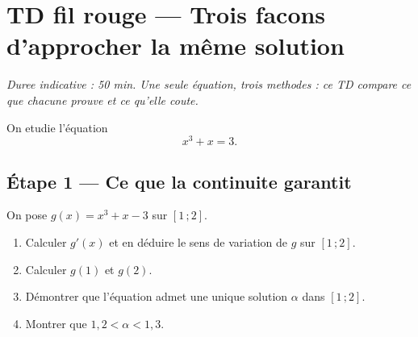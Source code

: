 
\section*{TD fil rouge — Trois facons d'approcher la même solution}

\emph{Duree indicative : 50 min. Une seule équation, trois methodes : ce TD
compare ce que chacune prouve et ce qu'elle coute.}

On etudie l'équation
\[ x^3 + x = 3. \]

\subsection*{Étape 1 — Ce que la continuite garantit}

On pose $g(x) = x^3 + x - 3$ sur $[1\,;2]$.

\begin{enumerate}
  \item Calculer $g'(x)$ et en déduire le sens de variation de $g$ sur $[1\,;2]$.
  \item Calculer $g(1)$ et $g(2)$.
  \item Démontrer que l'équation admet une unique solution $\alpha$ dans $[1\,;2]$.
  \item Montrer que $1{,}2 < \alpha < 1{,}3$.
\end{enumerate}

